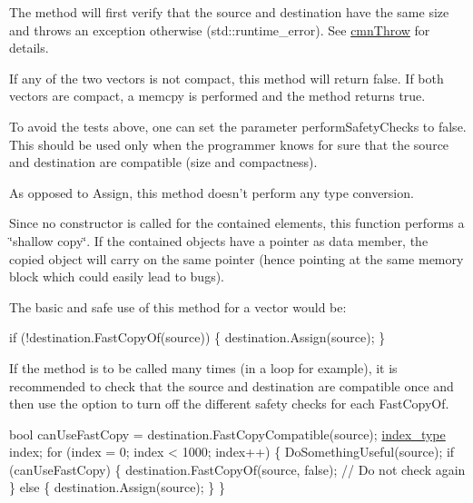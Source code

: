 \begin{DoxyItemize}
\item The method will first verify that the source and destination have the same size and throws an exception otherwise ({\ttfamily std\-::runtime\-\_\-error}). See \hyperlink{cmn_throw_8h_a6fe29a0b6f112fe0032896bb904f8377}{cmn\-Throw} for details.
\item If any of the two vectors is not compact, this method will return {\ttfamily false}. If both vectors are compact, a {\ttfamily memcpy} is performed and the method returns {\ttfamily true}.
\item To avoid the tests above, one can set the parameter {\ttfamily perform\-Safety\-Checks} to {\ttfamily false}. This should be used only when the programmer knows for sure that the source and destination are compatible (size and compactness).
\item As opposed to Assign, this method doesn't perform any type conversion.
\item Since no constructor is called for the contained elements, this function performs a \char`\"{}shallow copy\char`\"{}. If the contained objects have a pointer as data member, the copied object will carry on the same pointer (hence pointing at the same memory block which could easily lead to bugs).
\end{DoxyItemize}

The basic and safe use of this method for a vector would be\-: 
\begin{DoxyCode}
\textcolor{keywordflow}{if} (!destination.FastCopyOf(source)) \{
    destination.Assign(source);
\}
\end{DoxyCode}


If the method is to be called many times (in a loop for example), it is recommended to check that the source and destination are compatible once and then use the option to turn off the different safety checks for each Fast\-Copy\-Of. 
\begin{DoxyCode}
\textcolor{keywordtype}{bool} canUseFastCopy = destination.FastCopyCompatible(source);
\hyperlink{namespacevct_a50405d87494dce1f22ee3930ca285ee9}{index\_type} index;
\textcolor{keywordflow}{for} (index = 0; index < 1000; index++) \{
    DoSomethingUseful(source);
    \textcolor{keywordflow}{if} (canUseFastCopy) \{
        destination.FastCopyOf(source, \textcolor{keyword}{false}); \textcolor{comment}{// Do not check again}
    \} \textcolor{keywordflow}{else} \{
        destination.Assign(source);
    \}
\}
\end{DoxyCode}



